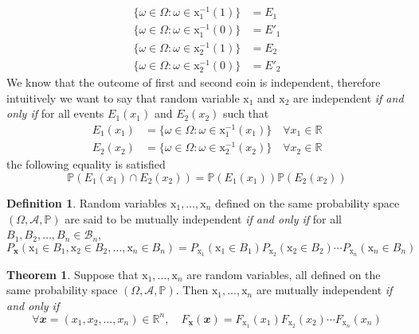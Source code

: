 \documentclass[twoside]{article}
\theoremstyle{definition}
\newtheorem{definition}{Definition}[section]
\newtheorem{theorem}{Theorem}[section]
\theoremstyle{remark}
\theoremstyle{remark}
\begin{document}
\begin{equation*}
  \begin{split}
    \{\omega \in \Omega : \omega \in \mathrm{x}_1^{-1}(1)\} &= E_1  \\
    \{\omega \in \Omega : \omega \in \mathrm{x}_1^{-1}(0)\} &= E'_1 \\
    \{\omega \in \Omega : \omega \in \mathrm{x}_2^{-1}(1)\} &= E_2  \\
    \{\omega \in \Omega : \omega \in \mathrm{x}_2^{-1}(0)\} &= E'_2
  \end{split}
\end{equation*}
We know that the outcome of first and second coin is independent, therefore
intuitively we want to say that random variable $\mathrm{x}_1$ and $\mathrm{x}_2$
are independent \textit{if and only if} for all events $E_1(x_1)$ and $E_2(x_2)$
such that
\begin{equation*}
  \begin{split}
    E_1(x_1) &= \{\omega \in \Omega : \omega \in \mathrm{x}_1^{-1}(x_1)\} \quad \forall x_1 \in \mathbb{R}\\
    E_2(x_2) &= \{\omega \in \Omega : \omega \in \mathrm{x}_2^{-1}(x_2)\} \quad \forall x_2 \in \mathbb{R}
  \end{split}
\end{equation*}
the following equality is satisfied
\begin{equation*}
  \mathbb{P}(E_1(x_1) \cap E_2(x_2)) = \mathbb{P}(E_1(x_1)) \mathbb{P}(E_2(x_2))
\end{equation*}

\begin{definition}
  Random variables $\mathrm{x}_1, \ldots, \mathrm{x}_n$ defined on the same
  probability space $(\Omega, \mathcal{A}, \mathbb{P})$ are said to be mutually
  independent \textit{if and only if} for all $B_1, B_2, \ldots, B_n \in \mathcal{B}_n$,
  \begin{equation}
    P_\mathbf{x}(\mathrm{x}_1 \in B_1, \mathrm{x}_2 \in B_2, \ldots, \mathrm{x}_n \in B_n)
    = P_{\mathrm{x}_1}(\mathrm{x}_1 \in B_1)
      P_{\mathrm{x}_2}(\mathrm{x}_2 \in B_2) \cdots
      P_{\mathrm{x}_n}(\mathrm{x}_n \in B_n)
  \end{equation}
\end{definition}

\begin{theorem}
  Suppose that $\mathrm{x}_1, \ldots, \mathrm{x}_n$ are random variables, all
  defined on the same probability space $(\Omega, \mathcal{A}, \mathbb{P})$. Then
  $\mathrm{x}_1, \ldots, \mathrm{x}_n$ are mutually independent \textit{if and only if}
  \begin{equation}
    \forall \mathbfit{x} = (x_1, x_2, \ldots, x_n) \in \mathbb{R}^n, \quad
    F_\mathbf{x}(\mathbfit{x})
    = F_{\mathrm{x}_1}(x_1)
      F_{\mathrm{x}_2}(x_2) \cdots
      F_{\mathrm{x}_n}(x_n)
  \end{equation}
\end{theorem}
\end{document}
